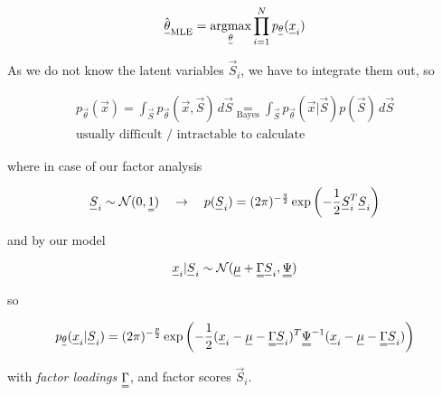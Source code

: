\begin{equation}
    \hat{\vec{\theta}}_{\text{MLE}} = \argmax_{\vec{\theta}} \prod_{i=1}^{N} p_{\vec{\theta}}(\vec{x}_i)
\end{equation}

As we do not know the latent variables $\vec{S}_i$, we have to integrate them out, so

\begin{equation}
    \begin{gathered}
        p_\vec{\theta}(\vec{x}) = \int_\vec{S} p_\vec{\theta} (\vec{x}, \vec{S}) \, d\vec{S} \underset{\text{Bayes}}{=} \int_\vec{S} p_\vec{\theta} (\vec{x} | \vec{S}) p(\vec{S}) \, d\vec{S} \\
        \text{usually difficult / intractable to calculate}
    \end{gathered}
\end{equation}

where in case of our factor analysis

\begin{equation}
    \vec{S}_i \sim \mathcal{N}(0, \mat{1}) \quad \rightarrow \quad p(\vec{S}_i) = (2\pi)^{-\frac{q}{2}} \exp \left( -\frac{1}{2} \vec{S}_i^T \vec{S}_i \right)
\end{equation}

and by our model

\begin{equation}
    \vec{x}_i | \vec{S}_i \sim \mathcal{N}(\vec{\mu} + \mat{\Gamma} \vec{S}_i, \mat{\Psi})
\end{equation}

so

\begin{equation}
    p_\vec{\theta}(\vec{x}_i | \vec{S}_i) = (2\pi)^{-\frac{p}{2}} \exp \left( -\frac{1}{2} (\vec{x}_i - \vec{\mu} - \mat{\Gamma} \vec{S}_i)^T \mat{\Psi}^{-1} (\vec{x}_i - \vec{\mu} - \mat{\Gamma} \vec{S}_i) \right)
\end{equation}

with \textit{factor loadings} $\mat{\Gamma}$, and factor scores $\vec{S}_i$.


